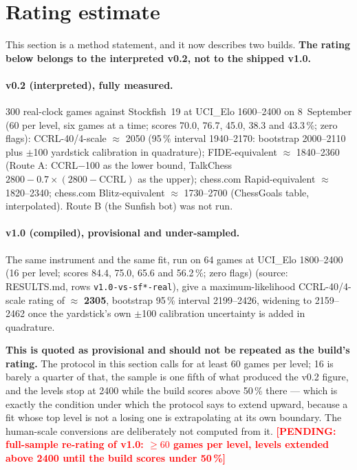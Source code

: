 \documentclass[11pt,a4paper]{article}
\newcommand{\pending}[1]{\textcolor{red}{\textbf{[PENDING: #1]}}}
\newcommand{\src}[1]{{\small(source: #1)}}
\newcommand{\code}[1]{\texttt{#1}}
\begin{document}
\section{Rating estimate}\label{sec:rating}
This section is a method statement, and it now describes two builds. \textbf{The rating below belongs to
the interpreted v0.2, not to the shipped v1.0.}

\paragraph{v0.2 (interpreted), fully measured.} 300 real-clock games against Stockfish~19 at UCI\_Elo
1600--2400 on 8~September (60 per level, six games at a time; scores 70.0, 76.7, 45.0, 38.3 and 43.3\,\%;
zero flags): CCRL-40/4-scale $\approx$ 2050 (95\,\% interval 1940--2170: bootstrap 2000--2110 plus
$\pm$100 yardstick calibration in quadrature); FIDE-equivalent $\approx$ 1840--2360 (Route A:
CCRL$-$100 as the lower bound, TalkChess $2800 - 0.7 \times (2800 - \mathrm{CCRL})$ as the upper);
chess.com Rapid-equivalent $\approx$ 1820--2340; chess.com Blitz-equivalent $\approx$ 1730--2700
(ChessGoals table, interpolated). Route B (the Sunfish bot) was not run.

\paragraph{v1.0 (compiled), provisional and under-sampled.} The same instrument and the same fit, run on
64 games at UCI\_Elo 1800--2400 (16 per level; scores 84.4, 75.0, 65.6 and 56.2\,\%; zero flags)
\src{RESULTS.md, rows \code{v1.0-vs-sf*-real}}, give a maximum-likelihood CCRL-40/4-scale rating of
$\approx$ \textbf{2305}, bootstrap 95\,\% interval 2199--2426, widening to 2159--2462 once the
yardstick's own $\pm$100 calibration uncertainty is added in quadrature.

\textbf{This is quoted as provisional and should not be repeated as the build's rating.} The protocol in
this section calls for at least 60 games per level; 16 is barely a quarter of that, the sample is one
fifth of what produced the v0.2 figure, and the levels stop at 2400 while the build scores above 50\,\%
there --- which is exactly the condition under which the protocol says to extend upward, because a fit
whose top level is not a losing one is extrapolating at its own boundary. The human-scale conversions are
deliberately not computed from it. \pending{full-sample re-rating of v1.0: $\geq 60$ games per level,
levels extended above 2400 until the build scores under 50\,\%}
\end{document}
